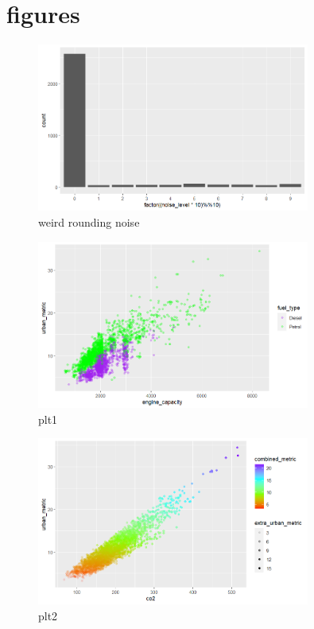 \documentclass{article}
\begin{document}
\section{figures}

\begin{figure}[h!]
        \centering
        \includegraphics[width=0.8\textwidth]{../plots/afronding noise.png}
        \caption{weird rounding noise}
        \label{fig:rounding}
\end{figure}


\begin{figure}[h!]
        \centering
        \includegraphics[width=0.8\textwidth]{../plots/plt1.png}
        \caption{plt1}
        \label{fig:plt1}
\end{figure}


\begin{figure}[h!]
        \centering
        \includegraphics[width=0.8\textwidth]{../plots/plt2.png}
        \caption{plt2}
        \label{fig:plt2}
\end{figure}   
\end{document}
